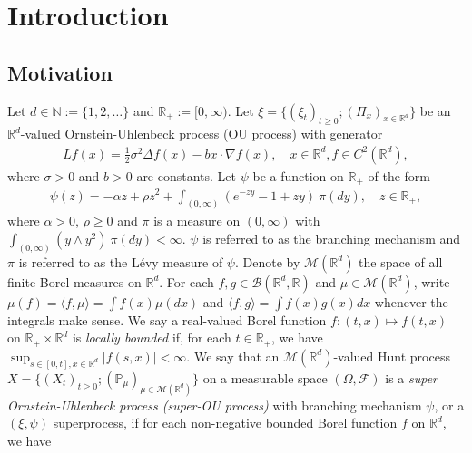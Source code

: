 \documentclass[12pt,a4paper]{amsart}
\theoremstyle{plain}
\theoremstyle{definition}
\numberwithin{equation}{section}
\begin{document}
\section{Introduction}
\subsection{Motivation}
\label{subsec:M}
Let $d \in \mathbb N:= \{1,2,\dots\}$ and $\mathbb R_+:= [0,\infty)$.
Let $\xi=\{(\xi_t)_{t\geq 0}; (\Pi_x)_{x\in \mathbb R^d}\}$ be an $\mathbb R^d$-valued Ornstein-Uhlenbeck process (OU process) with generator
\begin{align}
  Lf(x)
  = \frac{1}{2}\sigma^2\Delta f(x)-b x \cdot \nabla f(x)
  , \quad  x\in \mathbb R^d, f \in C^2(\mathbb R^d),
\end{align}
where $\sigma > 0$ and $b > 0$ are constants.
Let $\psi$ be a function on $\mathbb R_+$ of the form 
\begin{align} 
  \label{eq: honogeneou branching mechanism}
  \psi(z)=
  - \alpha z + \rho z^2 + \int_{(0,\infty)} (e^{-zy} - 1 + zy)~\pi(dy)
  , \quad  z \in \mathbb R_+,
\end{align}
where $\alpha > 0 $, $\rho \geq0$ and $\pi$ is a measure on $(0,\infty)$ with $\int_{(0,\infty)}(y\wedge y^2)~\pi(dy)< \infty$.
$\psi$ is referred to as the branching mechanism and $\pi$ is referred to as the L\'evy measure of $\psi$.
Denote by $\mathcal M(\mathbb R^d)$ the space of all finite Borel measures on $\mathbb R^d$.
For each $f,g\in \mathcal B(\mathbb R^d, \mathbb R)$ and $\mu \in \mathcal M(\mathbb R^d)$, write $\mu(f)=\langle f,\mu\rangle = \int f(x)\mu(dx)$ and $\langle f, g\rangle = \int f(x)g(x) dx$ whenever the integrals make sense.
We say a real-valued Borel function $f:(t,x)\mapsto f(t,x)$ on $\mathbb R_+\times \mathbb R^d$ is \emph{locally bounded} if, for each $t\in \mathbb R_+$, we have $ \sup_{s\in [0,t],x\in \mathbb R^d} |f(s,x)|<\infty. $
We say that an $\mathcal M(\mathbb R^d)$-valued Hunt process $X = \{(X_t)_{t\geq 0}; (\mathbb{P}_{\mu})_{\mu \in \mathcal M(\mathbb R^d)}\}$ on a measurable space $(\Omega, \mathcal{F})$ is a \emph{super Ornstein-Uhlenbeck process (super-OU process)} with branching mechanism $\psi$, or a $(\xi, \psi)$ superprocess, if for each non-negative bounded Borel function $f$ on $\mathbb R^d$, we have
\end{document}
